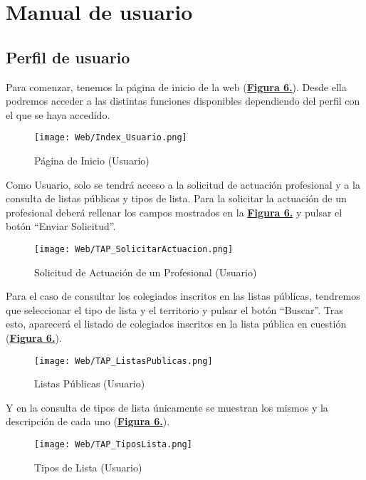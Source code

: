 \chapter{Manual de usuario}

\section{Perfil de usuario}
\addtocounter{figura_manual}{1} Para comenzar, tenemos la página de inicio de la web (\textbf{\hyperref[fig:Web_Index_Usuario]{Figura 6.}}). Desde ella podremos acceder a las distintas funciones disponibles dependiendo del perfil con el que se haya accedido.
\begin{figure}[!htbp]
  \centering
  \texttt{[image: Web/Index\_Usuario.png]}
  \caption{Página de Inicio (Usuario)}
  \label{fig:Web_Index_Usuario}
\end{figure}
\FloatBarrier

\addtocounter{figura_manual}{1} Como Usuario, solo se tendrá acceso a la solicitud de actuación profesional y a la consulta de listas públicas y tipos de lista. Para la solicitar la actuación de un profesional deberá rellenar los campos mostrados en la \textbf{\hyperref[fig:Web_TAP_SolicitarActuacion]{Figura 6.}} y pulsar el botón ``Enviar Solicitud''.
\begin{figure}[!htbp]
  \centering
  \texttt{[image: Web/TAP\_SolicitarActuacion.png]}
  \caption{Solicitud de Actuación de un Profesional (Usuario)}
  \label{fig:Web_TAP_SolicitarActuacion}
\end{figure}
\FloatBarrier

\addtocounter{figura_manual}{1} Para el caso de consultar los colegiados inscritos en las listas públicas, tendremos que seleccionar el tipo de lista y el territorio y pulsar el botón ``Buscar''. Tras esto, aparecerá el listado de colegiados inscritos en la lista pública en cuestión (\textbf{\hyperref[fig:Web_TAP_ListasPublicas]{Figura 6.}}).
\begin{figure}[!htbp]
  \centering
  \texttt{[image: Web/TAP\_ListasPublicas.png]}
  \caption{Listas Públicas (Usuario)}
  \label{fig:Web_TAP_ListasPublicas}
\end{figure}
\FloatBarrier

\addtocounter{figura_manual}{1} Y en la consulta de tipos de lista únicamente se muestran los mismos y la descripción de cada uno (\textbf{\hyperref[fig:Web_TAP_TiposLista]{Figura 6.}}).
\begin{figure}[!htbp]
  \centering
  \texttt{[image: Web/TAP\_TiposLista.png]}
  \caption{Tipos de Lista (Usuario)}
  \label{fig:Web_TAP_TiposLista}
\end{figure}
\FloatBarrier


